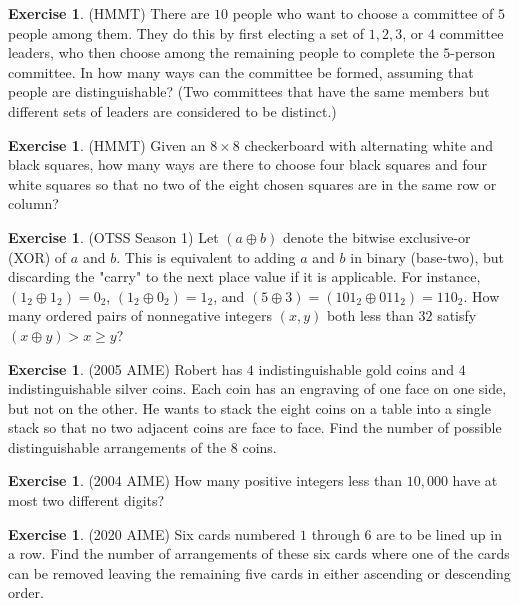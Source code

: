\documentclass[letterpaper]{article}
\theoremstyle{remark}
\theoremstyle{definition}
\newtheorem{exercise}[thm]{Exercise}
\begin{document}
\begin{exercise}
(HMMT) There are $10$ people who want to choose a committee of $5$ people among them. They do this by first electing a set of $1, 2, 3$, or $4$ committee leaders, who then choose among the remaining people to complete the $5$-person committee. In how many ways can the committee be formed, assuming that people are distinguishable? (Two committees that have the same members but different sets of leaders are considered to be distinct.)
\end{exercise}

\begin{exercise}
(HMMT) Given an $8\times 8$ checkerboard with alternating white and black squares, how many ways are there to choose four black squares and four white squares so that no two of the eight chosen squares are in the same row or column?
\end{exercise}


\begin{exercise}
(OTSS Season 1) Let $(a \oplus b)$ denote the bitwise exclusive-or (XOR) of $a$ and $b$. This is equivalent to adding $a$ and $b$ in binary (base-two), but discarding the "carry" to the next place value if it is applicable. For instance, $(1_2 \oplus 1_2) = 0_2$, $(1_2 \oplus 0_2) = 1_2$, and $(5\oplus 3)= (101_2\oplus 011_2)= 110_2$. How many ordered pairs of nonnegative integers $(x,y)$ both less than $32$ satisfy $(x \oplus y) > x \geq y$?
\end{exercise}

\begin{exercise}
(2005 AIME) Robert has $4$ indistinguishable gold coins and $4$ indistinguishable silver coins. Each coin has an engraving of one face on one side, but not on the other. He wants to stack the eight coins on a table into a single stack so that no two adjacent coins are face to face. Find the number of possible distinguishable arrangements of the $8$ coins.
\end{exercise}

\begin{exercise}
(2004 AIME) How many positive integers less than $10,000$ have at most two different digits?
\end{exercise}

\begin{exercise}
(2020 AIME) Six cards numbered $1$ through $6$ are to be lined up in a row. Find the number of arrangements of these six cards where one of the cards can be removed leaving the remaining five cards in either ascending or descending order.
\end{exercise}
\end{document}
